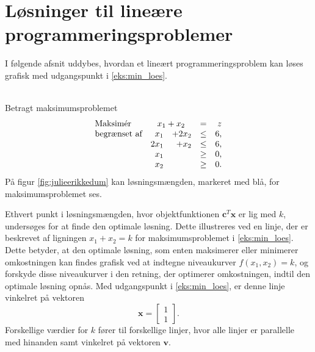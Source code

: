 \section{Løsninger til lineære programmeringsproblemer}
%
%
\label{heeeeejjulle}
%
%
I følgende afsnit uddybes, hvordan et lineært programmeringsproblem kan løses grafisk med udgangspunkt i \ref{eks:min_loes}.
\\\\
\begin{eks}
\label{eks:min_loes}
Betragt maksimumsproblemet
%
\begin{align*}
\begin{array}{lrrlr}
\text{Maksimér}		&	\multicolumn{2}{c}{x_1+x_2} &= &z\\
\text{begrænset af}	&x_1& + 2x_2			&\leq 	& 6,\\
					&2x_1& + x_2			&\leq	& 6,\\
					&x_1&    				&\geq	& 0,\\
					&x_2&    				&\geq	& 0.\\
\end{array}
\end{align*}
%
På figur \ref{fig:julieerikkedum} kan løsningsmængden, markeret med blå, for maksimumsproblemet ses. 
%

%
\end{eks}
%
%
%
Ethvert punkt i løsningsmængden, hvor objektfunktionen $\textbf{c}^T\textbf{x}$ er lig med $k$, undersøges for at finde den optimale løsning.
Dette illustreres ved en linje, der er beskrevet af ligningen $x_1+x_2=k$ for maksimumsproblemet i \ref{eks:min_loes}. 
Dette betyder, at den optimale løsning, som enten maksimerer eller minimerer omkostningen kan findes grafisk ved at indtegne niveaukurver $f(x_1, x_2)=k$, og forskyde disse niveaukurver i den retning, der optimerer omkostningen, indtil den optimale løsning opnås.  
Med udgangspunkt i \ref{eks:min_loes}, er denne linje vinkelret på vektoren 
%
$$
\textbf{x}=
\begin{bmatrix}
1\\1
\end{bmatrix}.
$$
%
Forskellige værdier for $k$ fører til forskellige linjer, hvor alle linjer er parallelle med hinanden samt vinkelret på vektoren $\textbf{v}$. 
